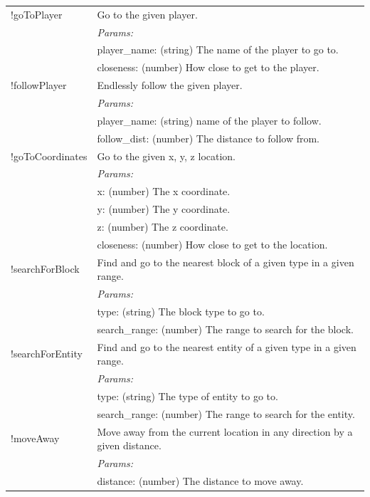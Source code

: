 \documentclass{article}
\begin{document}
\begin{table}[htbp]
\begin{tabular}{|p{}|p{}|}
    \hline
    !goToPlayer & Go to the given player. \\
    & \textit{Params:} \\
    & player\_name: (string) The name of the player to go to. \\
    & closeness: (number) How close to get to the player. \\
    \hline
    !followPlayer & Endlessly follow the given player. \\
    & \textit{Params:} \\
    & player\_name: (string) name of the player to follow. \\
    & follow\_dist: (number) The distance to follow from. \\
    \hline
    !goToCoordinates & Go to the given x, y, z location. \\
    & \textit{Params:} \\
    & x: (number) The x coordinate. \\
    & y: (number) The y coordinate. \\
    & z: (number) The z coordinate. \\
    & closeness: (number) How close to get to the location. \\
    \hline
    !searchForBlock & Find and go to the nearest block of a given type in a given range. \\
    & \textit{Params:} \\
    & type: (string) The block type to go to. \\
    & search\_range: (number) The range to search for the block. \\
    \hline
    !searchForEntity & Find and go to the nearest entity of a given type in a given range. \\
    & \textit{Params:} \\
    & type: (string) The type of entity to go to. \\
    & search\_range: (number) The range to search for the entity. \\
    \hline
    !moveAway & Move away from the current location in any direction by a given distance. \\
    & \textit{Params:} \\
    & distance: (number) The distance to move away. \\
    \hline
  \end{tabular}
  \label{tab:minecraft_commands}
\end{table}
\end{document}
